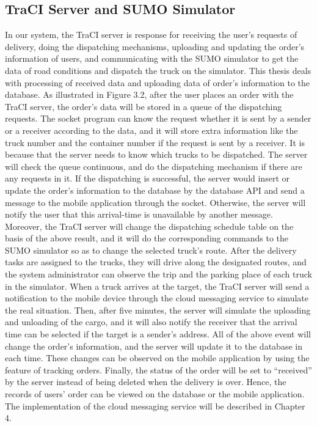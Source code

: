 \documentclass[12pt]{ksthesis}
\begin{document}
\begin{thesis}
{\section{TraCI Server and SUMO Simulator}
In our system, the TraCI server is response for receiving the user’s requests of delivery, doing the dispatching mechanisms, uploading and updating the order’s information of users, and communicating with the SUMO simulator to get the data of road conditions and dispatch the truck on the simulator. This thesis deals with processing of received data and uploading data of order’s information to the database.
As illustrated in Figure 3.2, after the user places an order with the TraCI server, the order’s data will be stored in a queue of the dispatching requests. The socket program can know the request whether it is sent by a sender or a receiver according to the data, and it will store extra information like the truck number and the container number if the request is sent by a receiver. It is because that the server needs to know which trucks to be dispatched. The server will check the queue continuous, and do the dispatching mechanism if there are any requests in it. If the dispatching is successful, the server would insert or update the order’s information to the database by the database API and send a message to the mobile application through the socket. Otherwise, the server will notify the user that this arrival-time is unavailable by another message. Moreover, the TraCI server will change the dispatching schedule table on the basis of the above result, and it will do the corresponding commands to the SUMO simulator so as to change the selected truck’s route.
After the delivery tasks are assigned to the trucks, they will drive along the designated routes, and the system administrator can observe the trip and the parking place of each truck in the simulator. When a truck arrives at the target, the TraCI server will send a notification to the mobile device through the cloud messaging service to simulate the real situation. Then, after five minutes, the server will simulate the uploading and unloading of the cargo, and it will also notify the receiver that the arrival time can be selected if the target is a sender’s address. All of the above event will change the order’s information, and the server will update it to the database in each time. These changes can be observed on the mobile application by using the feature of tracking orders. Finally, the status of the order will be set to “received” by the server instead of being deleted when the delivery is over. Hence, the records of users’ order can be viewed on the database or the mobile application. The implementation of the cloud messaging service will be described  in Chapter 4.

}
\end{thesis}
\end{document}
